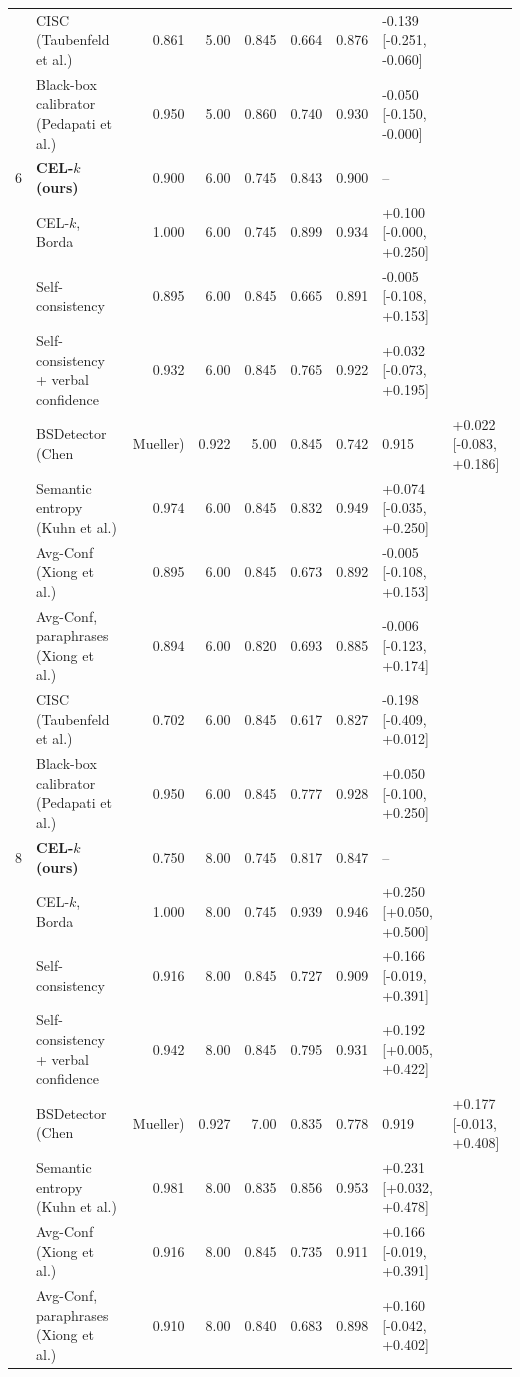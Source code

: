 \begin{table}[t]
\begin{tabular}{llrrrrrl}
 & CISC (Taubenfeld et al.) & 0.861 & 5.00 & 0.845 & 0.664 & 0.876 & -0.139 [-0.251, -0.060] \\
 & Black-box calibrator (Pedapati et al.) & 0.950 & 5.00 & 0.860 & 0.740 & 0.930 & -0.050 [-0.150, -0.000] \\
6 & \textbf{CEL-$k$ (ours)} & 0.900 & 6.00 & 0.745 & 0.843 & 0.900 & -- \\
 & \quad CEL-$k$, Borda & 1.000 & 6.00 & 0.745 & 0.899 & 0.934 & +0.100 [-0.000, +0.250] \\
 & Self-consistency & 0.895 & 6.00 & 0.845 & 0.665 & 0.891 & -0.005 [-0.108, +0.153] \\
 & Self-consistency + verbal confidence & 0.932 & 6.00 & 0.845 & 0.765 & 0.922 & +0.032 [-0.073, +0.195] \\
 & BSDetector (Chen & Mueller) & 0.922 & 5.00 & 0.845 & 0.742 & 0.915 & +0.022 [-0.083, +0.186] \\
 & Semantic entropy (Kuhn et al.) & 0.974 & 6.00 & 0.845 & 0.832 & 0.949 & +0.074 [-0.035, +0.250] \\
 & Avg-Conf (Xiong et al.) & 0.895 & 6.00 & 0.845 & 0.673 & 0.892 & -0.005 [-0.108, +0.153] \\
 & Avg-Conf, paraphrases (Xiong et al.) & 0.894 & 6.00 & 0.820 & 0.693 & 0.885 & -0.006 [-0.123, +0.174] \\
 & CISC (Taubenfeld et al.) & 0.702 & 6.00 & 0.845 & 0.617 & 0.827 & -0.198 [-0.409, +0.012] \\
 & Black-box calibrator (Pedapati et al.) & 0.950 & 6.00 & 0.845 & 0.777 & 0.928 & +0.050 [-0.100, +0.250] \\
8 & \textbf{CEL-$k$ (ours)} & 0.750 & 8.00 & 0.745 & 0.817 & 0.847 & -- \\
 & \quad CEL-$k$, Borda & 1.000 & 8.00 & 0.745 & 0.939 & 0.946 & +0.250 [+0.050, +0.500] \\
 & Self-consistency & 0.916 & 8.00 & 0.845 & 0.727 & 0.909 & +0.166 [-0.019, +0.391] \\
 & Self-consistency + verbal confidence & 0.942 & 8.00 & 0.845 & 0.795 & 0.931 & +0.192 [+0.005, +0.422] \\
 & BSDetector (Chen & Mueller) & 0.927 & 7.00 & 0.835 & 0.778 & 0.919 & +0.177 [-0.013, +0.408] \\
 & Semantic entropy (Kuhn et al.) & 0.981 & 8.00 & 0.835 & 0.856 & 0.953 & +0.231 [+0.032, +0.478] \\
 & Avg-Conf (Xiong et al.) & 0.916 & 8.00 & 0.845 & 0.735 & 0.911 & +0.166 [-0.019, +0.391] \\
 & Avg-Conf, paraphrases (Xiong et al.) & 0.910 & 8.00 & 0.840 & 0.683 & 0.898 & +0.160 [-0.042, +0.402] \\

\end{tabular}
\end{table}
